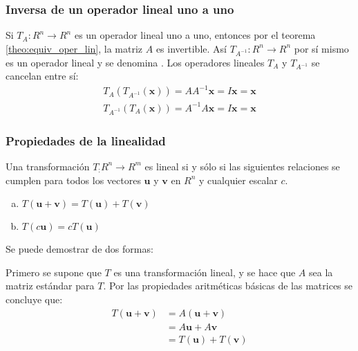 \documentclass[a4paper,12pt]{article}
\begin{document}
\subsubsection{Inversa de un operador lineal uno a uno}

Si $T_A:R^n\rightarrow R^n$ es un operador lineal uno a uno, entonces por el
teorema \ref{theo:equiv_oper_lin}, la matriz $A$ es invertible. Así
$T_{A^{-1}}:R^n\rightarrow R^n$ por sí mismo es un operador lineal y se
denomina . Los operadores lineales $T_A$ y $T_{A^{-1}}$
se cancelan entre sí:
\begin{align*}
  T_A(T_{A^{-1}}(\mathbf{x}))=AA^{-1}\mathbf{x}=I\mathbf{x}=\mathbf{x} \\
  T_{A^{-1}}(T_A(\mathbf{x}))=A^{-1}A\mathbf{x}=I\mathbf{x}=\mathbf{x}
\end{align*}

\subsubsection{Propiedades de la linealidad}

\begin{theorem}
  Una transformación $T_:R^n\rightarrow R^m$ es lineal si y sólo si las
  siguientes relaciones se cumplen para todos los vectores $\mathbf{u}$ y
  $\mathbf{v}$ en $R^n$ y cualquier escalar $c$.
  \begin{enumerate}[(a)]
    \item $T(\mathbf{u}+\mathbf{v})=T(\mathbf{u})+T(\mathbf{v})$
    \item $T(c\mathbf{u})=cT(\mathbf{u})$
  \end{enumerate}
  \label{theo:transf_lineal}
\end{theorem}

\demo Se puede demostrar de dos formas:

Primero se supone que $T$ es una transformación lineal, y se hace que $A$ sea
la matriz estándar para $T$. Por las propiedades aritméticas básicas de las
matrices se concluye que:
\begin{align*}
  T(\mathbf{u}+\mathbf{v})&=A(\mathbf{u}+\mathbf{v}) \\
                          &=A\mathbf{u}+A\mathbf{v}  \\
                          &=T(\mathbf{u})+T(\mathbf{v})
\end{align*}
\end{document}
